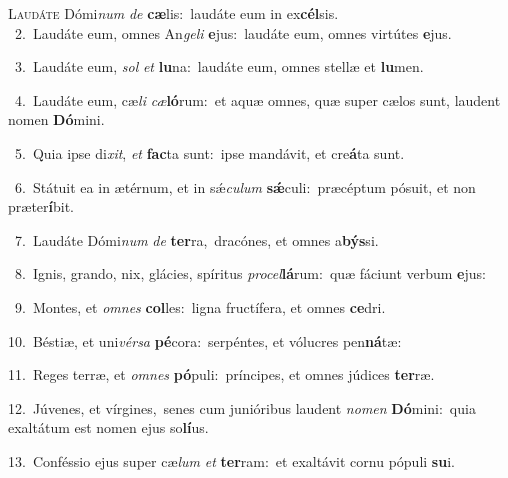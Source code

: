 \lettrine{\initial\textcolor{\initialcolor}{L}}{audáte} Dómi\textit{num} \textit{de} \textbf{cæ}\-lis:~\star laudáte eum in ex\-\textbf{cél}\-sis.\\
{\numbfont\textcolor{\numbcolor}{~2.}}~Laudáte eum, omnes An\-\textit{ge}\-\textit{li} \textbf{e}\-jus:~\star laudáte eum, omnes virtútes \textbf{e}\-jus.\par
{\numbfont\textcolor{\numbcolor}{~3.}}~Laudáte eum, \textit{sol} \textit{et} \textbf{lu}\-na:~\star laudáte eum, omnes stellæ et \textbf{lu}\-men.\par
{\numbfont\textcolor{\numbcolor}{~4.}}~Laudáte eum, cæ\textit{li} \textit{cæ}\-\textbf{ló}rum:~\star et aquæ omnes, quæ super cælos sunt, laudent nomen \textbf{Dó}\-mini.\par
{\numbfont\textcolor{\numbcolor}{~5.}}~Quia ipse di\-\textit{xit}\-, \textit{et} \textbf{fac}\-ta sunt:~\star ipse mandávit, et cre\-\textbf{á}\-ta sunt.\par
{\numbfont\textcolor{\numbcolor}{~6.}}~Státuit ea in ætérnum, et in sǽ\-\textit{cu}\-\textit{lum} \textbf{sǽ}\-culi:~\star præcéptum pósuit, et non præter\-\textbf{í}\-bit.\par
{\numbfont\textcolor{\numbcolor}{~7.}}~Laudáte Dómi\textit{num} \textit{de} \textbf{ter}\-ra,~\star dracónes, et omnes a\-\textbf{býs}\-si.\par
{\numbfont\textcolor{\numbcolor}{~8.}}~Ignis, grando, nix, glácies, spíritus \textit{pro}\-\textit{cel}\textbf{lá}rum:~\star quæ fáciunt verbum \textbf{e}\-jus:\par
{\numbfont\textcolor{\numbcolor}{~9.}}~Montes, et \textit{om}\-\textit{nes} \textbf{col}\-les:~\star ligna fructífera, et omnes \textbf{ce}\-dri.\par
{\numbfont\textcolor{\numbcolor}{10.}}~Béstiæ, et uni\-\textit{vér}\-\textit{sa} \textbf{pé}\-cora:~\star serpéntes, et vólucres pen\-\textbf{ná}\-tæ:\par
{\numbfont\textcolor{\numbcolor}{11.}}~Reges terræ, et \textit{om}\-\textit{nes} \textbf{pó}\-puli:~\star príncipes, et omnes júdices \textbf{ter}\-ræ.\par
{\numbfont\textcolor{\numbcolor}{12.}}~Júvenes, et vírgines,~\dagger senes cum junióribus laudent \textit{no}\-\textit{men} \textbf{Dó}\-mini:~\star quia exaltátum est nomen ejus so\-\textbf{lí}\-us.\par
{\numbfont\textcolor{\numbcolor}{13.}}~Conféssio ejus super cæ\textit{lum} \textit{et} \textbf{ter}\-ram:~\star et exaltávit cornu pópuli \textbf{su}\-i.\par
